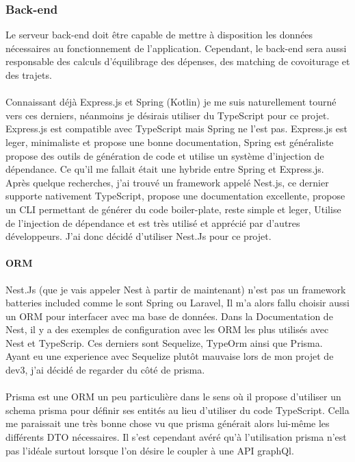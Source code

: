 \subsubsection{Back-end}\label{subsubsec:back-end}
Le serveur back-end doit être capable de mettre à disposition les données nécessaires au fonctionnement de l'application.
Cependant, le back-end sera aussi responsable des calculs d'équilibrage des dépenses, des matching de covoiturage et des trajets.\\\\

Connaissant déjà Express.js et Spring (Kotlin) je me suis naturellement tourné vers ces derniers, néanmoins je désirais utiliser du TypeScript pour ce projet.
Express.js est compatible avec TypeScript mais Spring ne l'est pas.
Express.js est leger, minimaliste et propose une bonne documentation,
Spring est généraliste propose des outils de génération de code et utilise un système d'injection de dépendance.
Ce qu'il me fallait était une hybride entre Spring et Express.js.
Après quelque recherches, j'ai trouvé un framework appelé Nest.js, ce dernier supporte nativement TypeScript, propose une documentation excellente,
propose un CLI permettant de générer du code boiler-plate, reste simple et leger, Utilise de l'injection de dépendance et est très utilisé et apprécié par d'autres développeurs.
J'ai donc décidé d'utiliser Nest.Js pour ce projet.

\paragraph{ORM}
Nest.Js (que je vais appeler Nest à partir de maintenant) n'est pas un framework batteries included comme le sont Spring ou Laravel,
Il m'a alors fallu choisir aussi un ORM pour interfacer avec ma base de données.
Dans la Documentation de Nest, il y a des exemples de configuration avec les ORM les plus utilisés avec Nest et TypeScrip.
Ces derniers sont Sequelize, TypeOrm ainsi que Prisma.
Ayant eu une experience avec Sequelize plutôt mauvaise lors de mon projet de dev3, j'ai décidé de regarder du côté de prisma.\\\\

Prisma est une ORM un peu particulière dans le sens où il propose d'utiliser un schema prisma pour définir ses entités au lieu d'utiliser du code TypeScript.
Cella me paraissait une très bonne chose vu que prisma générait alors lui-même les différents DTO nécessaires.
Il s'est cependant avéré qu'à l'utilisation prisma n'est pas l'idéale surtout lorsque l'on désire le coupler à une API graphQl.\\

